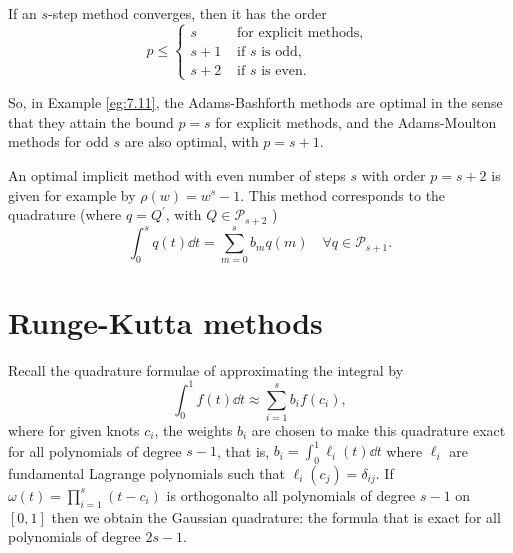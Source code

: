 \documentclass[a4paper]{article}
\begin{document}
\begin{theorem}
    If an $s$-step method converges, then it has the order
\[
p \leq \begin{cases}
s & \text { for explicit methods, } \\
s+1 & \text { if } s \text { is odd, } \\
s+2 & \text { if } s \text { is even. }
\end{cases}
\]
\end{theorem}
So, in Example \ref{eg:7.11}, the Adams-Bashforth methods are optimal in the sense that they attain the bound $p=s$ for explicit methods, and the Adams-Moulton methods for odd $s$ are also optimal, with $p=s+1$.

An optimal implicit method with even number of steps $s$ with order $p=s+2$ is given for example by $\rho(w)=w^s-1$. This method corresponds to the quadrature (where $q=Q^{\prime}$, with $Q \in \mathcal{P}_{s+2}$ )
\[
\int_0^s q(t) \dd{t}=\sum_{m=0}^s b_m q(m) \quad \forall q \in \mathcal{P}_{s+1} .
\]

\section{Runge-Kutta methods}

Recall the quadrature formulae of approximating the integral by 
\begin{equation}
    \int_{0}^{1} f(t) \dd{t} \approx \sum_{i=1}^{s}b_i f(c_i),
\end{equation}
where for given knots $c_i$, the weights $b_i$ are chosen to make this quadrature exact for all polynomials of degree $s-1$, that is, $ b_i = \int_{0}^{1} \ell_i (t) \dd{t} $ where $\ell_i$ are fundamental Lagrange polynomials such that $ \ell_i(c_j) = \delta_{ij} $. 
If $ \omega(t) = \prod_{i=1}^{s}(t-c_i) $ is orthogonalto all polynomials of degree $s-1$ on $[0,1]$ then we obtain the Gaussian quadrature: the formula that is exact for all polynomials of degree $2s-1$. 
\end{document}
